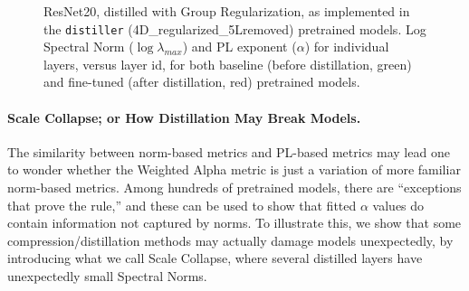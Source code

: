 \begin{figure}[t]
   \centering
   \qquad
   \caption{%
            ResNet20, distilled with Group Regularization, as implemented in the \texttt{distiller} (4D\_regularized\_5Lremoved) pretrained models.  
            Log Spectral Norm ($\log\lambda_{max}$) and PL exponent ($\alpha$) for individual layers, versus layer id, for both baseline (before distillation, green) and fine-tuned (after distillation, red) pretrained models. 
           }
   \label{fig:resnet204D5L}
\end{figure}


\paragraph{Scale Collapse; or How Distillation May Break Models.}

The similarity between norm-based metrics and PL-based metrics may lead one to wonder whether the Weighted Alpha metric is just a variation of more familiar norm-based metrics.  
Among hundreds of pretrained models, there are ``exceptions that prove the rule,'' and these can be used to show that fitted $\alpha$ values do contain information not captured by norms. 
To illustrate this, we show that some compression/distillation methods \cite{CWZZ17_TR} may actually damage models unexpectedly, by introducing what we call Scale Collapse, where several distilled layers have unexpectedly small Spectral Norms.

